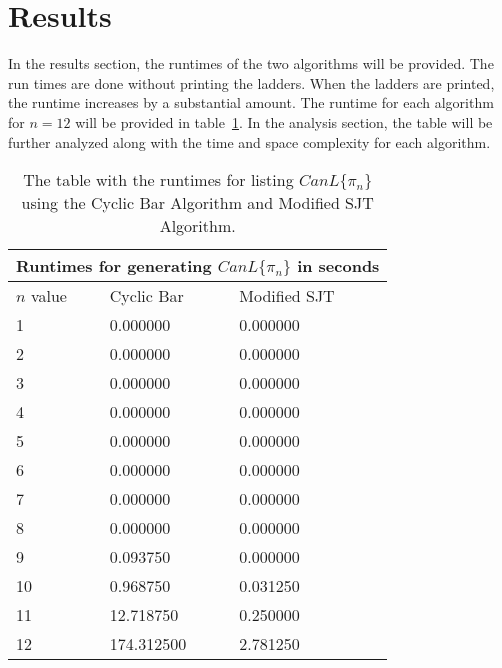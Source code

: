 \section{Results}
    In the results section, the runtimes of the two algorithms will be provided. The run times are done without printing the ladders. 
    When the ladders are printed, the runtime increases by a substantial amount. 
    The runtime for each algorithm for $n=12$ will be provided in table~\ref{Table:ListingResults}. 
    In the analysis section, the table will be further analyzed along with 
    the time and space complexity for each algorithm.
 \begin{center}
    \begin{table}
        \centering
    \begin{tabular}{ |p{3cm}||p{3cm}|p{3cm}|}
        \hline
        \multicolumn{3}{|c|}{Runtimes for generating $CanL\{\pi_{n}\}$ in seconds} \\
        \hline
            $n$ value& Cyclic Bar & Modified SJT\\
        \hline
            1   & 0.000000    &0.000000\\
            \hline
            2 &   0.000000  & 0.000000\\

            \hline
            3 &0.000000 & 0.000000\\
            \hline
            4 &0.000000 & 0.000000\\
            \hline
            5 &   0.000000  & 0.000000\\
            \hline
            6 & 0.000000  & 0.000000  \\
            \hline
            7 & 0.000000  & 0.000000\\
            \hline
            8 & 0.000000 & 0.000000\\
            \hline
            9 & 0.093750 & 0.000000\\
            \hline
            10 & 0.968750 & 0.031250\\
            \hline

            11 & 12.718750 & 0.250000\\
            \hline 
            12 & 174.312500 & 2.781250\\
        \hline
    \end{tabular}
    \caption{The table with the runtimes for listing $CanL\{\pi_{n}\}$ using the Cyclic Bar Algorithm and Modified SJT Algorithm.}
    \label{Table:ListingResults}
    \end{table}
\end{center}\pagebreak